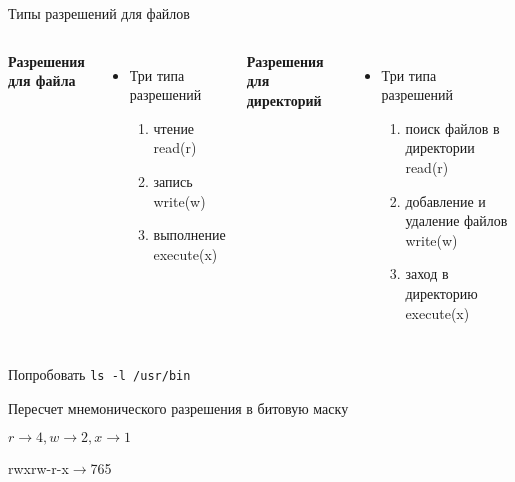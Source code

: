 \documentclass[ignorenonframetext, professionalfonts, hyperref={pdftex, unicode}]{beamer}
\begin{document}
\begin{frame}{Типы разрешений для файлов}
\begin{columns}
\begin{center}
  \textbf{Разрешения для файла}
\end{center}
\begin{itemize}
  \item Три типа разрешений
    \begin{enumerate}
      \item чтение read(r)
      \item запись write(w)
      \item выполнение execute(x)
    \end{enumerate}
\end{itemize}
\begin{center}
  \textbf{Разрешения для директорий}
\end{center}
\begin{itemize}
  \item Три типа разрешений
    \begin{enumerate}
      \item поиск файлов в директории read(r) 
      \item добавление и удаление файлов write(w)
      \item заход в директорию execute(x)
    \end{enumerate}
\end{itemize}
\end{columns}

\pause

Попробовать {\tt ls -l /usr/bin}

\pause

Пересчет мнемонического разрешения в битовую маску 

$r\to4, w\to2 , x\to1$ 

rwxrw-r-x$\to$765
\end{frame}

\end{document}
